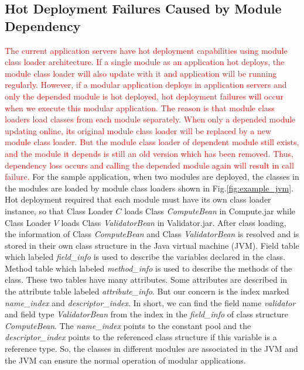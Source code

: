 \documentclass[conference]{IEEEtran}
\begin{document}
\subsection{Hot Deployment Failures Caused by Module Dependency}

\textcolor{red}{The current application servers have hot deployment capabilities using module class loader architecture.
}\textcolor{red}{If a single module as an application hot deploys, the module class loader will also update with it and application will be running regularly.
However, if a modular application deploys in application servers and only the depended module is hot deployed, hot deployment failures will occur when we execute this modular application.
The reason is that module class loaders load classes from each module separately.
When only a depended module updating online, its original module class loader will be replaced by a new module class loader.
But the module class loader of dependent module still exists, and the module it depends is still an old version which has been removed.
Thus, dependency loss occurs and calling the depended module again will result in call failure.
}
For the sample application, when two modules are deployed, the classes in the modules are loaded by module class loaders shown in Fig.\ref{fig:example_jvm}. 
Hot deployment required that each module must have its own class loader instance, so that Class Loader $C$ loads Class \emph{ComputeBean} in Compute.jar while Class Loader $V$ loads Class \emph{ValidatorBean} in Validator.jar.
After class loading, the information of Class \emph{ComputeBean} and Class \emph{ValidatorBean} is resolved and is stored in their own class structure in the Java virtual machine (JVM). 
Field table which labeled \emph{field\_info} is used to describe the variables declared in the class. 
Method table which labeled \emph{method\_info} is used to describe the methods of the class. 
These two tables have many attributes. 
Some attributes are described in the attribute table labeled \emph{attribute\_info}. 
But our concern is the index marked \emph{name\_index} and \emph{descriptor\_index}. 
In short, we can find the field name \emph{validator} and field type \emph{ValidatorBean} from the index in the \emph{field\_info} of class structure \emph{ComputeBean}. 
The \emph{name\_index} points to the constant pool and the \emph{descriptor\_index} points to the referenced class structure if this variable is a reference type\cite{jvm_book}. 
So, the classes in different modules are associated in the JVM and the JVM can ensure the normal operation of modular applications.
\end{document}
